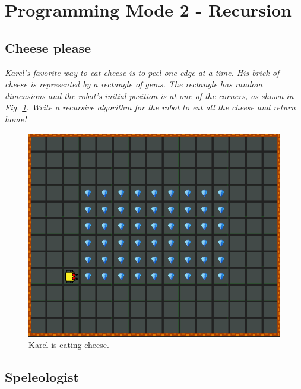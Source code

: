 
\section{Programming Mode 2 - Recursion}

\subsection{Cheese please}

{\em Karel's favorite way to eat cheese is to peel one edge at a time. His brick of 
cheese is represented by a rectangle of gems. The rectangle has random dimensions
and the robot's initial position is at one of the corners, as shown in Fig. \ref{fig:g01}.
Write a recursive algorithm for the robot to eat all the cheese and return home!
 }
\begin{figure}[!ht]
\begin{center}
\includegraphics[height=0.4\textwidth]{img/g01.png}
\end{center}
\vspace{-4mm}
\caption{Karel is eating cheese.}
\label{fig:g01}
\vspace{-1cm}
\end{figure}
\newpage


\subsection{Speleologist}

